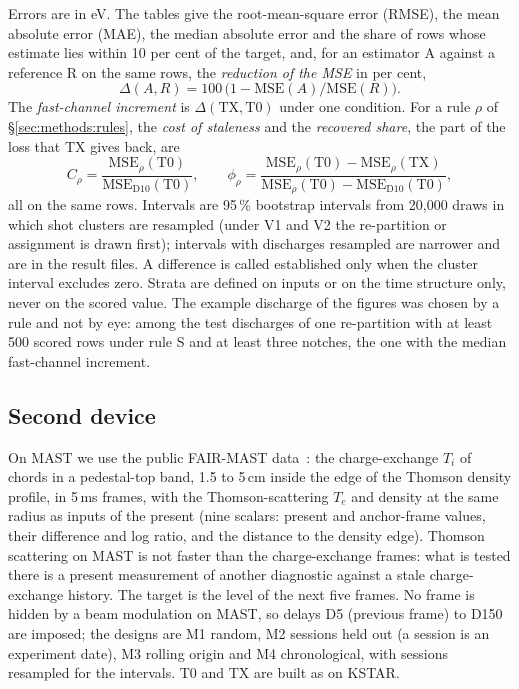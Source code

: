 \documentclass[11pt,a4paper]{article}
\newcommand{\Ti}{\ensuremath{T_i}}
\newcommand{\Te}{\ensuremath{T_e}}
\begin{document}
Errors are in eV. The tables give the root-mean-square error (RMSE), the mean absolute
error (MAE), the median absolute error and the share of rows whose estimate lies within
10 per cent of the target, and, for an estimator A against a reference R on the same
rows, the \emph{reduction of the MSE} in per cent,
\begin{equation}
  \Delta(A, R) = 100\,\bigl(1 - \mathrm{MSE}(A)/\mathrm{MSE}(R)\bigr).
  \label{eq:delta}
\end{equation}
The \emph{fast-channel increment} is $\Delta(\mathrm{TX}, \mathrm{T0})$ under one
condition. For a rule $\rho$ of \S\ref{sec:methods:rules}, the \emph{cost of staleness}
and the \emph{recovered share}, the part of the loss that TX gives back, are
\begin{equation}
  C_\rho = \frac{\mathrm{MSE}_\rho(\mathrm{T0})}{\mathrm{MSE}_{\mathrm{D10}}(\mathrm{T0})},
  \qquad
  \phi_\rho = \frac{\mathrm{MSE}_\rho(\mathrm{T0}) - \mathrm{MSE}_\rho(\mathrm{TX})}
  {\mathrm{MSE}_\rho(\mathrm{T0}) - \mathrm{MSE}_{\mathrm{D10}}(\mathrm{T0})},
  \label{eq:cost}
\end{equation}
all on the same rows. Intervals are 95\,\% bootstrap intervals from 20{,}000 draws in
which shot clusters are resampled (under V1 and V2 the re-partition or assignment is
drawn first); intervals with discharges resampled are narrower and are in the result
files. A difference is called established only when the cluster interval excludes zero.
Strata are defined on inputs or on the time structure only, never on the scored value.
The example discharge of the figures was chosen by a rule and not by eye: among the test
discharges of one re-partition with at least 500 scored rows under rule S and at least
three notches, the one with the median fast-channel increment.

\subsection{Second device}
\label{sec:methods:mast}

On MAST we use the public FAIR-MAST data~\citep{Jackson2024FairMast}: the charge-exchange
\Ti{} of chords in a pedestal-top band, 1.5 to 5\,cm inside the edge of the Thomson
density profile, in 5\,ms frames, with the Thomson-scattering \Te{} and density at the
same radius as inputs of the present (nine scalars: present and anchor-frame values,
their difference and log ratio, and the distance to the density edge). Thomson scattering
on MAST is not faster than the charge-exchange frames: what is tested there is a present
measurement of another diagnostic against a stale charge-exchange history. The target is the level
of the next five frames. No frame is hidden by a beam modulation on MAST, so delays D5
(previous frame) to D150 are imposed; the designs are M1 random, M2 sessions held out (a
session is an experiment date), M3 rolling origin and M4 chronological, with sessions
resampled for the intervals. T0 and TX are built as on KSTAR.
\end{document}
